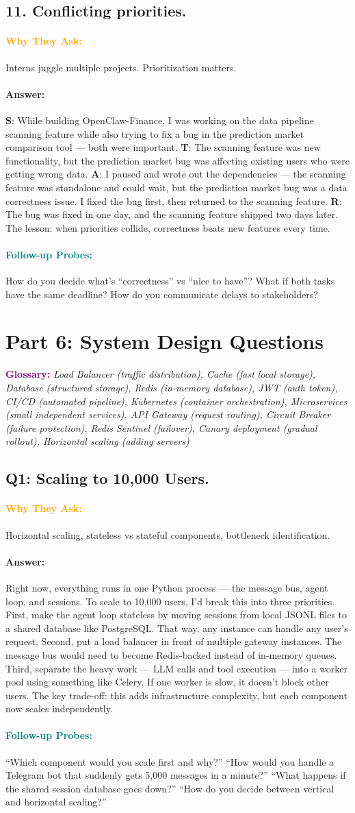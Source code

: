 \documentclass[11pt,a4paper]{article}
\newcommand{\Q}[1]{\subsection{#1}}
\newcommand{\Ans}[1]{\paragraph{\textbf{Answer:}} #1}
\newcommand{\Why}{\paragraph{\textcolor{orange}{\textbf{Why They Ask:}}}}
\newcommand{\Probe}{\paragraph{\textcolor{teal}{\textbf{Follow-up Probes:}}}}
\begin{document}
\Q{11. Conflicting priorities.}
\Why Interns juggle multiple projects. Prioritization matters.
\Ans \textbf{S}: While building OpenClaw-Finance, I was working on the data pipeline scanning feature while also trying to fix a bug in the prediction market comparison tool --- both were important. \textbf{T}: The scanning feature was new functionality, but the prediction market bug was affecting existing users who were getting wrong data. \textbf{A}: I paused and wrote out the dependencies --- the scanning feature was standalone and could wait, but the prediction market bug was a data correctness issue. I fixed the bug first, then returned to the scanning feature. \textbf{R}: The bug was fixed in one day, and the scanning feature shipped two days later. The lesson: when priorities collide, correctness beats new features every time.
\Probe How do you decide what's ``correctness'' vs ``nice to have''? What if both tasks have the same deadline? How do you communicate delays to stakeholders?

\newpage
\section{Part 6: System Design Questions}

\textcolor{purple}{\textbf{Glossary:}} \textit{Load Balancer (traffic distribution), Cache (fast local storage), Database (structured storage), Redis (in-memory database), JWT (auth token), CI/CD (automated pipeline), Kubernetes (container orchestration), Microservices (small independent services), API Gateway (request routing), Circuit Breaker (failure protection), Redis Sentinel (failover), Canary deployment (gradual rollout), Horizontal scaling (adding servers)}

\Q{Q1: Scaling to 10,000 Users.}
\Why Horizontal scaling, stateless vs stateful components, bottleneck identification.
\Ans Right now, everything runs in one Python process --- the message bus, agent loop, and sessions. To scale to 10,000 users, I'd break this into three priorities. First, make the agent loop stateless by moving sessions from local JSONL files to a shared database like PostgreSQL. That way, any instance can handle any user's request. Second, put a load balancer in front of multiple gateway instances. The message bus would need to become Redis-backed instead of in-memory queues. Third, separate the heavy work --- LLM calls and tool execution --- into a worker pool using something like Celery. If one worker is slow, it doesn't block other users. The key trade-off: this adds infrastructure complexity, but each component now scales independently.
\Probe ``Which component would you scale first and why?'' ``How would you handle a Telegram bot that suddenly gets 5,000 messages in a minute?'' ``What happens if the shared session database goes down?'' ``How do you decide between vertical and horizontal scaling?''
\end{document}
